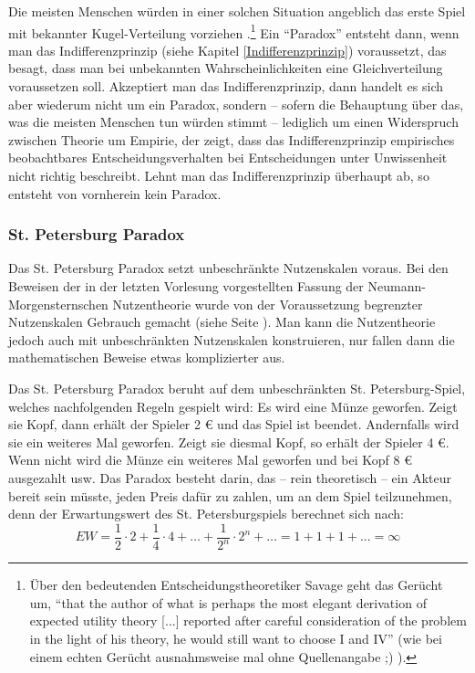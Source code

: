 Die meisten Menschen würden in einer solchen Situation angeblich das erste Spiel
mit bekannter Kugel-Verteilung vorziehen \cite[S.
24]{myerson:1991}.\footnote{Über den bedeutenden Entscheidungstheoretiker Savage
geht das Gerücht um, ``that the author of what is perhaps the most elegant
derivation of expected utility theory [...] reported after careful consideration
of the problem in the light of his theory, he would still want to choose I and
IV'' (wie bei einem echten Gerücht ausnahmsweise mal ohne Quellenangabe ;) ).}
 Ein "`Paradox"' entsteht dann, wenn man das
Indifferenzprinzip (siehe Kapitel \ref{Indifferenzprinzip}) voraussetzt, das
besagt, dass man bei unbekannten Wahrscheinlichkeiten eine Gleichverteilung
voraussetzen soll. Akzeptiert man das Indifferenzprinzip, dann handelt es sich
aber wiederum nicht um ein Paradox, sondern -- sofern die Behauptung über das,
was die meisten Menschen tun würden stimmt -- lediglich um einen Widerspruch
zwischen Theorie um Empirie, der zeigt, dass das Indifferenzprinzip empirisches
beobachtbares Entscheidungsverhalten bei Entscheidungen unter Unwissenheit nicht
richtig beschreibt. Lehnt man das Indifferenzprinzip überhaupt ab, so entsteht
von vornherein kein Paradox.

\subsubsection{St. Petersburg Paradox}

Das St. Petersburg Paradox setzt unbeschränkte Nutzenskalen voraus. Bei den
Beweisen der in der letzten Vorlesung vorgestellten Fassung der
Neumann-Morgensternschen Nutzentheorie wurde von der Voraussetzung
begrenzter Nutzenskalen Gebrauch gemacht (siehe Seite
\pageref{bestesSchlechtestesGut}). Man kann die
Nutzentheorie jedoch auch mit unbeschränkten Nutzenskalen konstruieren, 
nur fallen dann die mathematischen Beweise etwas komplizierter aus.

Das St. Petersburg Paradox beruht auf dem un\-be\-schränkten St.
Peters\-burg-Spiel, welches nachfolgenden Regeln gespielt wird: Es wird eine
Münze geworfen. Zeigt sie Kopf, dann erhält der Spieler 2 € und das Spiel ist
beendet. Andernfalls wird sie ein weiteres Mal geworfen. Zeigt sie diesmal Kopf,
so erhält der Spieler 4 €. Wenn nicht wird die Münze ein weiteres Mal geworfen
und bei Kopf 8 € ausgezahlt usw. Das Paradox besteht darin, das -- rein
theoretisch -- ein Akteur bereit sein müsste, jeden Preis dafür zu zahlen, um an
dem Spiel teilzunehmen, denn der Erwartungswert des St. Petersburgspiels
berechnet sich nach: \[ EW = \frac{1}{2}\cdot 2 + \frac{1}{4}\cdot 4 + \ldots +
\frac{1}{2^n} \cdot 2^n + \ldots = 1+1+1+\ldots = \infty \]

